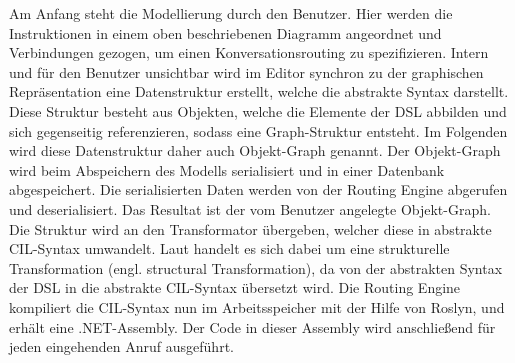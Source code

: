  Am Anfang steht die Modellierung durch den Benutzer. Hier werden die Instruktionen in einem oben beschriebenen Diagramm angeordnet und Verbindungen gezogen, um einen Konversationsrouting zu spezifizieren. Intern und für den Benutzer unsichtbar wird im Editor synchron zu der graphischen Repräsentation eine Datenstruktur erstellt, welche die abstrakte Syntax darstellt. Diese Struktur besteht aus Objekten, welche die Elemente der DSL abbilden und sich gegenseitig referenzieren, sodass eine Graph-Struktur entsteht. Im Folgenden wird diese Datenstruktur daher auch Objekt-Graph genannt. Der Objekt-Graph wird beim Abspeichern des Modells serialisiert und in einer Datenbank abgespeichert. Die serialisierten Daten werden von der Routing Engine abgerufen und deserialisiert. Das Resultat ist der vom Benutzer angelegte Objekt-Graph. Die Struktur wird an den Transformator übergeben, welcher diese in abstrakte CIL-Syntax umwandelt. Laut \cite[S. 72f]{Kleppe:09} handelt es sich dabei um eine strukturelle Transformation (engl. structural Transformation), da von der abstrakten Syntax der DSL in die abstrakte CIL-Syntax übersetzt wird. Die Routing Engine kompiliert die CIL-Syntax nun im Arbeitsspeicher mit der Hilfe von Roslyn, und erhält eine .NET-Assembly. Der Code in dieser Assembly wird anschließend für jeden eingehenden Anruf ausgeführt. 

